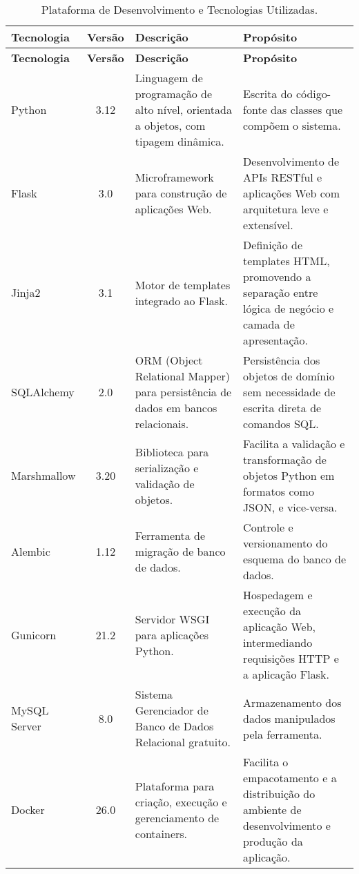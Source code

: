 \begin{footnotesize}
\begin{longtable}{|p{1.8cm}|c|p{5cm}|p{6.3cm}|}
	\caption{Plataforma de Desenvolvimento e Tecnologias Utilizadas.}	
	\label{tabela-plataforma}\\\hline

	\rowcolor{lightgray}
	\textbf{Tecnologia} & \textbf{Versão} & \textbf{Descrição} & \textbf{Propósito} \\\hline 
	\endfirsthead
	\hline
	\rowcolor{lightgray}
	\textbf{Tecnologia} & \textbf{Versão} & \textbf{Descrição} & \textbf{Propósito} \\\hline 
	\endhead	

	Python & 3.12 & Linguagem de programação de alto nível, orientada a objetos, com tipagem dinâmica. & Escrita do código-fonte das classes que compõem o sistema. \\\hline
	
	Flask & 3.0 & Microframework para construção de aplicações Web. & Desenvolvimento de APIs RESTful e aplicações Web com arquitetura leve e extensível.  \\\hline  
	
	Jinja2 & 3.1 & 	Motor de templates integrado ao Flask. & Definição de templates HTML, promovendo a separação entre lógica de negócio e camada de apresentação. \\\hline
	
	SQLAlchemy & 2.0 & ORM (Object Relational Mapper) para persistência de dados em bancos relacionais. & Persistência dos objetos de domínio sem necessidade de escrita direta de comandos SQL. \\\hline
	
	Marshmallow & 3.20 & Biblioteca para serialização e validação de objetos. & Facilita a validação e transformação de objetos Python em formatos como JSON, e vice-versa. \\\hline
	
	Alembic & 1.12 &  Ferramenta de migração de banco de dados. & Controle e versionamento do esquema do banco de dados. \\\hline
	
	Gunicorn & 21.2 &  Servidor WSGI para aplicações Python. & Hospedagem e execução da aplicação Web, intermediando requisições HTTP e a aplicação Flask. \\\hline
	
	MySQL Server & 8.0 & Sistema Gerenciador de Banco de Dados Relacional gratuito. & Armazenamento dos dados manipulados pela ferramenta. \\\hline
	
	Docker & 26.0 & Plataforma para criação, execução e gerenciamento de containers. & Facilita o empacotamento e a distribuição do ambiente de desenvolvimento e produção da aplicação. \\\hline
\end{longtable}
\end{footnotesize}






